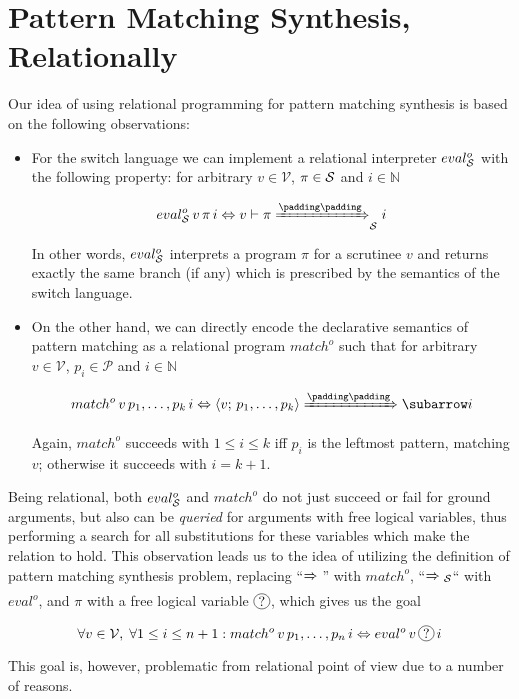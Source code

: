 \section{Pattern Matching Synthesis, Relationally}

Our idea of using relational programming for pattern matching synthesis is based on the following observations:

\begin{itemize}
\item For the switch language we can implement a relational interpreter $eval^o_{\mathcal{S}}$ with the following property: for
  arbitrary $v\in\mathcal V$, $\pi\in\mathcal{S}$ and $i\in\mathbb N$
 
  \[
  \setarrow{\xRightarrow}
  \setsubarrow{_\ir}
   eval^o_\ir\, v\, \pi\, i \Leftrightarrow \withenv{v}{\trans{\pi}{}{i}}
  \]

  In other words, $eval^o_{\mathcal{S}}$ interprets a program $\pi$ for a scrutinee $v$ and returns exactly the same branch (if any)
  which is prescribed by the semantics of the switch language. 
  
\item On the other hand, we can directly encode the declarative semantics of pattern matching as a relational
  program $match^o$ such that for arbitrary $v\in\mathcal V$, $p_i\in\mathcal P$ and $i\in\mathbb N$

  \[
  \setarrow{\xRightarrow}
  match^o\,v\,p_1,\dots,p_k\,i \Leftrightarrow \trans{\inbr{v;\,p_1,\dots,p_k}}{}{i}
  \]

  Again, $match^o$ succeeds with $1\le i\le k$ iff $p_i$ is the leftmost pattern, matching $v$; otherwise it
  succeeds with $i=k+1$.
\end{itemize}

Being relational, both $eval^o_{\mathcal{S}}$ and $match^o$ do not just succeed or fail for ground arguments, but also can be \emph{queried} for
arguments with free logical variables, thus performing a search for all substitutions for these variables which make the
relation to hold. This observation leads us to the idea of utilizing the definition of pattern matching
synthesis problem, replacing ``$\xRightarrow{}{}$'' with $match^o$, ``$\xRightarrow{}{}_{\mathcal S}$`` with $eval^o$,
and $\pi$ with a free logical variable $\circled{?}$, which gives us the goal

\[
\forall v\in \mathcal V,\; \forall 1\le i\le n+1 : match^o\,v\,p_1,\dots,p_n\,i\Leftrightarrow eval^o\,v\,\circled{?}\,i
\]

This goal is, however, problematic from relational point of view due to a number of reasons.

